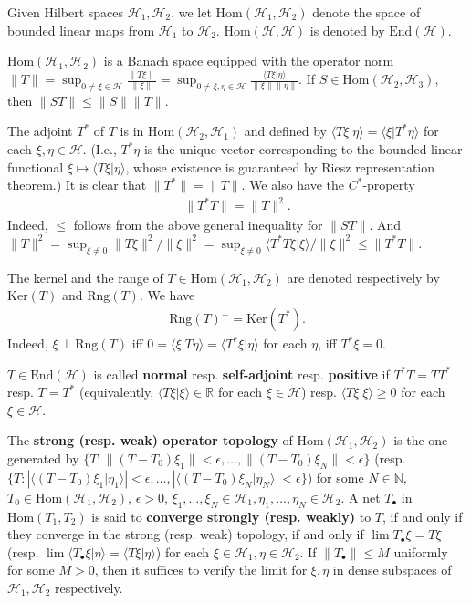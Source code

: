 \documentclass[12pt,b5paper,notitlepage]{article}
\theoremstyle{definition}
\theoremstyle{plain}
\newcommand{\mc}{\mathcal}
\newcommand{\End}{\mathrm{End}} %
\newcommand{\Hom}{\mathrm{Hom}}
\newcommand{\bk}[1]{\langle {#1}\rangle}
\newcommand{\blt}{\bullet}
\newcommand{\Nbb}{\mathbb N}
\newcommand{\Rbb}{\mathbb R}
\newcommand{\Ker}{\mathrm{Ker}}
\newcommand{\Rng}{\mathrm{Rng}}
\numberwithin{equation}{section}
\begin{document}
Given Hilbert spaces $\mc H_1,\mc H_2$, we let $\Hom(\mc H_1,\mc H_2)$ \index{Hom@$\Hom(\mc H_1,\mc H_2)$} denote the space of bounded linear maps from $\mc H_1$ to $\mc H_2$. $\Hom(\mc H,\mc H)$ is denoted by $\End(\mc H)$.\index{End@$\End(\mc H)$} 

$\Hom(\mc H_1,\mc H_2)$ is a Banach space equipped with the operator norm $\lVert T\lVert=\sup_{0\neq\xi\in\mc H} \frac{\lVert T\xi\lVert}{\lVert\xi\lVert}=\sup_{0\neq\xi,\eta\in\mc H}\frac {\bk{T\xi|\eta}}{\lVert\xi\lVert \lVert\eta\lVert}$. If $S\in\Hom(\mc H_2,\mc H_3)$, then $\lVert ST\lVert\leq\lVert S\lVert \lVert T\lVert$.

The adjoint $T^*$ of $T$ is in $\Hom(\mc H_2,\mc H_1)$ and defined by $\bk{T\xi|\eta}=\bk{\xi|T^*\eta}$ for each $\xi,\eta\in\mc H$. (I.e., $T^*\eta$ is the unique vector corresponding to the bounded linear functional $\xi\mapsto\bk{T\xi|\eta}$, whose existence is guaranteed by Riesz representation theorem.) It is clear that $\lVert T^*\lVert=\lVert T\lVert$. We also have the $C^*$-property
\begin{align}\label{eq3}
	\lVert T^*T\lVert=\lVert T\lVert^2.
\end{align}
Indeed, $\leq$ follows from the above general inequality for $\lVert ST\lVert$. And $\lVert T\lVert^2=\sup_{\xi\neq 0} \lVert T\xi\lVert^2/\lVert\xi\lVert^2=\sup_{\xi\neq 0} \bk{T^*T\xi|\xi}/\lVert\xi\lVert^2\leq \lVert T^*T\lVert$.




The kernel and the range of $T\in\Hom(\mc H_1,\mc H_2)$ are denoted respectively by $\Ker(T)$ and $\Rng(T)$. We have
\begin{align}
\Rng(T)^\perp=\Ker (T^*).\label{eq19}	
\end{align}
Indeed, $\xi\perp\Rng(T)$ iff $0=\bk{\xi|T\eta}=\bk{T^*\xi|\eta}$ for each $\eta$, iff $T^*\xi=0$.

$T\in\End(\mc H)$ is called \textbf{normal} resp. \textbf{self-adjoint} resp. \textbf{positive}  if $T^*T=TT^*$ resp. $T=T^*$ (equivalently, $\bk{T\xi|\xi}\in\Rbb$ for each $\xi\in\mc H$) resp. $\bk{T\xi|\xi}\geq 0$ for each $\xi\in\mc H$.

The \textbf{strong (resp. weak) operator topology} of $\Hom(\mc H_1,\mc H_2)$ is the one generated by $\{T:\lVert (T-T_0)\xi_1\lVert<\epsilon,\dots,\lVert (T-T_0)\xi_N\lVert<\epsilon\}$ (resp. $\{T:|\bk{(T-T_0)\xi_1|\eta_1}|<\epsilon,\dots,|\bk{(T-T_0)\xi_N|\eta_N}|<\epsilon\}$) for some $N\in\Nbb$, $T_0\in\Hom(\mc H_1,\mc H_2)$,  $\epsilon>0$, $\xi_1,\dots,\xi_N\in\mc H_1,\eta_1,\dots,\eta_N\in\mc H_2$. A net $T_\blt$ in $\Hom(T_1,T_2)$ is said to \textbf{converge strongly (resp. weakly)} to $T$, if and only if they converge in the strong (resp. weak) topology, if and only if $\lim T_\blt\xi=T\xi$ (resp. $\lim\bk{T_\blt\xi|\eta}=\bk{T\xi|\eta}$) for each $\xi\in\mc H_1,\eta\in\mc H_2$. If $\lVert T_\blt\lVert\leq M$ uniformly for some $M>0$, then it suffices to verify the limit for $\xi,\eta$ in dense subspaces of $\mc H_1,\mc H_2$ respectively.
\end{document}
